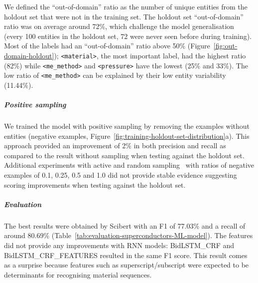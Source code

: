 \documentclass[]{interact}
\theoremstyle{plain}%
\theoremstyle{definition}
\theoremstyle{remark}
\begin{document}
We defined the ``out-of-domain'' ratio as the number of unique entities from the holdout set that were not in the training set.
The holdout set ``out-of-domain'' ratio was on average around 72\%, which challenge the model generalisation (every 100 entities in the holdout set, 72 were never seen before during training).
Most of the labels had an ``out-of-domain'' ratio above 50\%  (Figure~\ref{fig:out-domain-holdout});  \texttt{<material>}, the most important label, had the highest ratio (82\%) while \texttt{<me\_method>} and \texttt{<pressure>} have the lowest (25\% and 33\%). 
The low ratio of \texttt{<me\_method>} can be explained by their low entity variability (11.44\%).

\subparagraph*{Positive sampling}
We trained the model with positive sampling by removing the examples without entities (negative examples, Figure~\ref{fig:training-holdout-set-distribution}a).
This approach provided an improvement of 2\% in both precision and recall as compared to the result without sampling when testing against the holdout set.
Additional experiments with active and random sampling~\cite{lopez2021mining} with ratios of negative examples of 0.1, 0.25, 0.5 and 1.0 did not provide stable evidence suggesting scoring improvements when testing against the holdout set. 

\subparagraph*{Evaluation}
The best results were obtained by Scibert with an F1 of 77.03\% and a recall of around 80.69\% (Table~\ref{tab:evaluation-superconductors-ML-model}).
The features did not provide any improvements with RNN models: BidLSTM\_CRF and BidLSTM\_CRF\_FEATURES resulted in the same F1 score.
This result comes as a surprise because features such as superscript/subscript were expected to be determinants for recognising material sequences.
\end{document}
